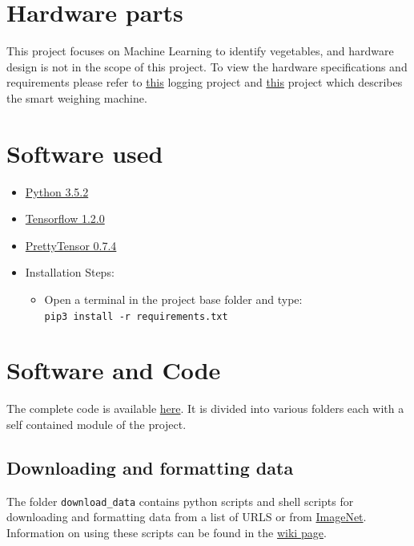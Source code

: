 \documentclass[a4paper,12pt,oneside]{book}
\begin{document}
\section{Hardware parts}
This project focuses on Machine Learning to identify vegetables, and hardware design is not in the scope of this project. To view the hardware specifications and requirements please refer to \href{https://github.com/eYSIP-2017/eYSIP-2017_Development_of_Web_Interface_for_GH_Farm_Produce}{this} logging project and \href{https://github.com/Ankurrpanwar26/eYSIP-2016-Farm-Produce-Logging-and-Monitoring}{this} project which describes the smart weighing machine.


\newpage
\section{Software used}
\begin{itemize}
  \item \href{https://www.python.org/downloads/release/python-352/}{Python 3.5.2}
  \item \href{https://pypi.python.org/pypi/tensorflow/1.2.0}{Tensorflow 1.2.0}
  \item \href{https://github.com/google/prettytensor}{PrettyTensor 0.7.4} 
  \item Installation Steps:
  \begin{itemize}
  	\item Open a terminal in the project base folder and type: \\
  	\texttt{pip3 install -r requirements.txt}
  \end{itemize}
\end{itemize}


\section{Software and Code}
The complete code is available \href{https://github.com/eYSIP-2017/eYSIP-2017_Vegetable-Identification-Using-Transfer-Learning}{here}. It is divided into various folders each with a self contained module of the project.

\subsection{Downloading and formatting data}
The folder \texttt{download\_data} contains python scripts and shell scripts for downloading and formatting data from a list of URLS or from \href{http://www.image-net.org/}{ImageNet}. Information on using these scripts can be found in the \href{https://github.com/eYSIP-2017/eYSIP-2017_Vegetable-Identification-Using-Transfer-Learning/wiki/Downloading-and-formatting-data.}{wiki page}.
\end{document}
